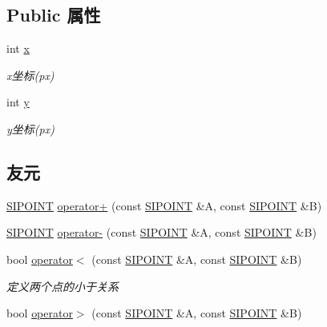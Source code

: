 \subsection*{Public 属性}
\begin{DoxyCompactItemize}
\item 
\mbox{\label{struct_s_i_p_o_i_n_t_a2375f32079fea6d73191df2bfe08cb1d}} 
int \hyperlink{struct_s_i_p_o_i_n_t_a2375f32079fea6d73191df2bfe08cb1d}{x}
\begin{DoxyCompactList}\small\item\em x坐标(px) \end{DoxyCompactList}\item 
\mbox{\label{struct_s_i_p_o_i_n_t_a1ed590aa0d87cf51a0d30a44d1c03e93}} 
int \hyperlink{struct_s_i_p_o_i_n_t_a1ed590aa0d87cf51a0d30a44d1c03e93}{y}
\begin{DoxyCompactList}\small\item\em y坐标(px) \end{DoxyCompactList}\end{DoxyCompactItemize}
\subsection*{友元}
\begin{DoxyCompactItemize}
\item 
\hyperlink{struct_s_i_p_o_i_n_t}{S\+I\+P\+O\+I\+NT} \hyperlink{struct_s_i_p_o_i_n_t_abd9be7eb5a981ba5d72d548a32052a01}{operator+} (const \hyperlink{struct_s_i_p_o_i_n_t}{S\+I\+P\+O\+I\+NT} \&A, const \hyperlink{struct_s_i_p_o_i_n_t}{S\+I\+P\+O\+I\+NT} \&B)
\item 
\hyperlink{struct_s_i_p_o_i_n_t}{S\+I\+P\+O\+I\+NT} \hyperlink{struct_s_i_p_o_i_n_t_a1138454683665c35746e210cbf614306}{operator-\/} (const \hyperlink{struct_s_i_p_o_i_n_t}{S\+I\+P\+O\+I\+NT} \&A, const \hyperlink{struct_s_i_p_o_i_n_t}{S\+I\+P\+O\+I\+NT} \&B)
\item 
bool \hyperlink{struct_s_i_p_o_i_n_t_a481c4c62e5b71e5106efc08bd0674b6d}{operator$<$} (const \hyperlink{struct_s_i_p_o_i_n_t}{S\+I\+P\+O\+I\+NT} \&A, const \hyperlink{struct_s_i_p_o_i_n_t}{S\+I\+P\+O\+I\+NT} \&B)
\begin{DoxyCompactList}\small\item\em 定义两个点的小于关系 \end{DoxyCompactList}\item 
bool \hyperlink{struct_s_i_p_o_i_n_t_a815335b01039f8eabf5ef5d797dd3e49}{operator$>$} (const \hyperlink{struct_s_i_p_o_i_n_t}{S\+I\+P\+O\+I\+NT} \&A, const \hyperlink{struct_s_i_p_o_i_n_t}{S\+I\+P\+O\+I\+NT} \&B)
\end{DoxyCompactItemize}


